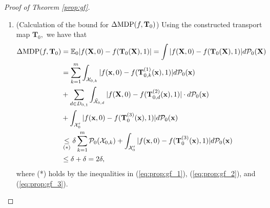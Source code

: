 \documentclass[10pt]{article} %
\begin{document}
\begin{proof}[Proof of Theorem \ref{prop:gf}]
\begin{enumerate}
        \item (Calculation of the bound for $\Delta \textup{MDP}(f, \mathbf{T}_{0})$)
        Using the constructed transport map $\mathbf{T}_{0},$ we have that
            \begin{equation}
                \begin{split}
                    \Delta \textup{MDP}(f, \mathbf{T}_{0}) & = \mathbb{E}_{0} \vert f(\mathbf{X}, 0) - f(\mathbf{T}_{0}(\mathbf{X}), 1) \vert 
                    = \int \vert f(\mathbf{X}, 0) - f(\mathbf{T}_{0}(\mathbf{X}), 1) \vert d\mathcal{P}_{0}(\mathbf{X})
                    \\
                    & = \sum_{k = 1}^{m} \int_{\mathcal{X}_{0, k}} \vert f(\mathbf{x}, 0) - f(\mathbf{T}_{0, k}^{(1)}(\mathbf{x}), 1) \vert d\mathcal{P}_{0}(\mathbf{x})
                    \\
                    & + \sum_{d \in D_{0, 1}} \int_{\tilde{\mathcal{X}}_{0, d}} \vert f(\mathbf{X}, 0) - f(\mathbf{T}_{0, d}^{(2)}(\mathbf{x}), 1) \vert \cdot d\mathcal{P}_{0}(\mathbf{x})
                    \\
                    & + \int_{\mathcal{X}_{0}'} \vert f(\mathbf{x}, 0) - f(\mathbf{T}_{0}^{(3)}(\mathbf{x}), 1) \vert d\mathcal{P}_{0}(\mathbf{x})
                    \\
                    & \underset{(*)}{\le} \delta \sum_{k = 1}^{m} \mathcal{P}_{0} ( \mathcal{X}_{0, k} ) 
                    + \int_{\mathcal{X}_{0}'} \vert f(\mathbf{x}, 0) - f(\mathbf{T}_{0}^{(3)}(\mathbf{x}), 1) \vert d\mathcal{P}_{0}(\mathbf{x})
                    \\
                    & \le \delta + \delta = 2 \delta,
                \end{split}
            \end{equation}
            where (*) holds by the inequalities in (\ref{eq:prop:gf_1}), (\ref{eq:prop:gf_2}), and (\ref{eq:prop:gf_3}).
    \end{enumerate}
\end{proof}

\clearpage
\end{document}
